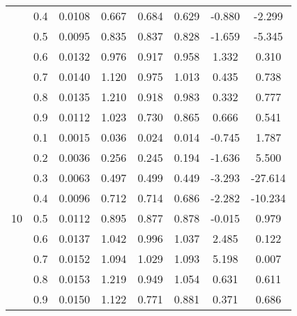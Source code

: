 \documentclass[11pt,a4paper]{report}
\begin{document}
\begin{longtable}{ | c | c || c | c | c | c | c | c | }
 & 0.4 & 0.0108 & 0.667 & 0.684 & 0.629 & -0.880 & -2.299 \\
 & 0.5 & 0.0095 & 0.835 & 0.837 & 0.828 & -1.659 & -5.345 \\
 & 0.6 & 0.0132 & 0.976 & 0.917 & 0.958 & 1.332 & 0.310 \\
 & 0.7 & 0.0140 & 1.120 & 0.975 & 1.013 & 0.435 & 0.738 \\
 & 0.8 & 0.0135 & 1.210 & 0.918 & 0.983 & 0.332 & 0.777 \\
 & 0.9 & 0.0112 & 1.023 & 0.730 & 0.865 & 0.666 & 0.541 \\
 \hline
\multirow{9}{*}{10} & 0.1 & 0.0015 & 0.036 & 0.024 & 0.014 & -0.745 & 1.787 \\
 & 0.2 & 0.0036 & 0.256 & 0.245 & 0.194 & -1.636 & 5.500 \\
 & 0.3 & 0.0063 & 0.497 & 0.499 & 0.449 & -3.293 & -27.614 \\
 & 0.4 & 0.0096 & 0.712 & 0.714 & 0.686 & -2.282 & -10.234 \\
 & 0.5 & 0.0112 & 0.895 & 0.877 & 0.878 & -0.015 & 0.979 \\
 & 0.6 & 0.0137 & 1.042 & 0.996 & 1.037 & 2.485 & 0.122 \\
 & 0.7 & 0.0152 & 1.094 & 1.029 & 1.093 & 5.198 & 0.007 \\
 & 0.8 & 0.0153 & 1.219 & 0.949 & 1.054 & 0.631 & 0.611 \\
 & 0.9 & 0.0150 & 1.122 & 0.771 & 0.881 & 0.371 & 0.686 \\
 \hline
\hline
\end{longtable}
\end{document}
